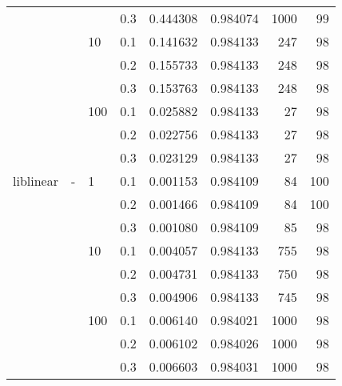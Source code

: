 \begin{table}[H]
\begin{tabular}{llllrrrr}
          &   &     & 0.3 &  0.444308 &  0.984074 &    1000 &    99 \\
          &   & 10  & 0.1 &  0.141632 &  0.984133 &     247 &    98 \\
          &   &     & 0.2 &  0.155733 &  0.984133 &     248 &    98 \\
          &   &     & 0.3 &  0.153763 &  0.984133 &     248 &    98 \\
          &   & 100 & 0.1 &  0.025882 &  0.984133 &      27 &    98 \\
          &   &     & 0.2 &  0.022756 &  0.984133 &      27 &    98 \\
          &   &     & 0.3 &  0.023129 &  0.984133 &      27 &    98 \\
liblinear & - & 1   & 0.1 &  0.001153 &  0.984109 &      84 &   100 \\
          &   &     & 0.2 &  0.001466 &  0.984109 &      84 &   100 \\
          &   &     & 0.3 &  0.001080 &  0.984109 &      85 &    98 \\
          &   & 10  & 0.1 &  0.004057 &  0.984133 &     755 &    98 \\
          &   &     & 0.2 &  0.004731 &  0.984133 &     750 &    98 \\
          &   &     & 0.3 &  0.004906 &  0.984133 &     745 &    98 \\
          &   & 100 & 0.1 &  0.006140 &  0.984021 &    1000 &    98 \\
          &   &     & 0.2 &  0.006102 &  0.984026 &    1000 &    98 \\
          &   &     & 0.3 &  0.006603 &  0.984031 &    1000 &    98 \\
\bottomrule
\end{tabular}
\end{table}
